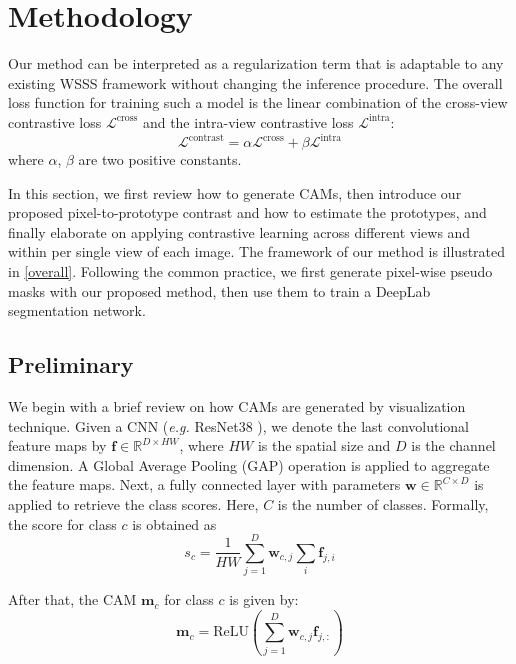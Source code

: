\documentclass[10pt,twocolumn,letterpaper]{article}
\begin{document}
\section{Methodology}
Our method can be interpreted as a regularization term that is adaptable to any existing WSSS framework without changing the inference procedure.
The overall loss function for training such a model is the linear combination of the cross-view contrastive loss $\mathcal{L}^{\text{cross}}$ and the intra-view contrastive loss $\mathcal{L}^{\text{intra}}$:
\begin{equation}
    \mathcal{L}^{\text{contrast}} = \alpha \mathcal{L}^{\text{cross}} + \beta \mathcal{L}^{\text{intra}}
\end{equation}
where $\alpha$, $\beta$ are two positive constants.

In this section, we first review how to generate CAMs, then introduce our proposed pixel-to-prototype contrast and how to estimate the prototypes, and finally elaborate on applying contrastive learning across different views and within per single view of each image.
The framework of our method is illustrated in \cref{overall}. 
Following the common practice, we first generate pixel-wise pseudo masks with our proposed method, then use them to train a DeepLab \cite{chen2014semantic_Deeplabv1, chen2017deeplabV2} segmentation network. 


\subsection{Preliminary}
We begin with a brief review on how CAMs are generated by visualization technique.
Given a CNN (\textit{e.g.} ResNet38 \cite{Resnet38}), we denote the last convolutional feature maps by $\boldsymbol{f} \in \mathbb{R}^{D \times HW}$, where $HW$ is the spatial size and $D$ is the channel dimension.
A Global Average Pooling (GAP) operation is applied to aggregate the feature maps. Next, a fully connected layer with parameters $\boldsymbol{w} \in \mathbb{R}^{C \times D} $ is applied to retrieve the class scores. Here, $C$ is the number of classes. Formally, the score for class $c$ is obtained as
\begin{equation}
    s_c = \frac{1}{HW} \sum_{j=1}^{D}\boldsymbol{w}_{c,j}\sum_{i}\boldsymbol{f}_{j,i}
\end{equation}

After that, the CAM $\boldsymbol{m}_{c}$ for class $c$ is given by:
\begin{equation}
  \boldsymbol{m}_{c} = \text{ReLU}\left(\sum_{j=1}^D\boldsymbol{w}_{c, j}\boldsymbol{f}_{j,:} \right)
\end{equation}
\end{document}
